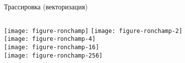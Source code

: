\begin{frame}{Трассировка (векторизация)}
\begin{columns}
\texttt{[image: figure-ronchamp]}
\texttt{[image: figure-ronchamp-2]}\\[1ex]
\texttt{[image: figure-ronchamp-4]}\\[1ex]
\texttt{[image: figure-ronchamp-16]}\\[1ex]
\texttt{[image: figure-ronchamp-256]}
\end{columns}
\end{frame}
